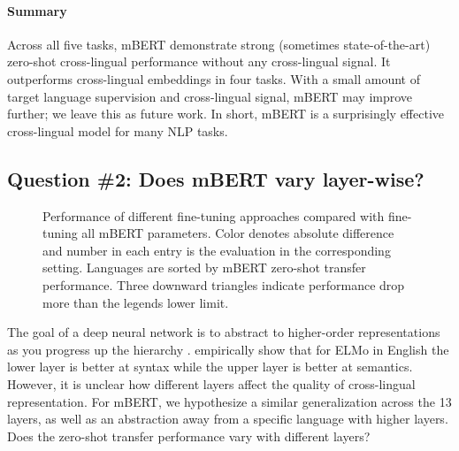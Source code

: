 \documentclass[11pt,a4paper]{article}
\begin{document}
\paragraph{Summary} Across all five tasks, mBERT demonstrate strong (sometimes state-of-the-art) zero-shot cross-lingual performance without any cross-lingual signal. It outperforms cross-lingual embeddings in four tasks. With a small amount of target language supervision and cross-lingual signal, mBERT may improve further; we leave this as future work. In short, mBERT is a surprisingly effective cross-lingual model for many NLP tasks.


\subsection{Question \#2: Does mBERT vary layer-wise?}\label{sec:exp2}


\begin{figure*}[ht]
\centering
{}
\qquad

\qquad


\caption{Performance of different fine-tuning approaches compared with fine-tuning all mBERT parameters. Color denotes absolute difference and number in each entry is the evaluation in the corresponding setting. Languages are sorted by mBERT zero-shot transfer performance. Three downward triangles indicate performance drop more than the legends lower limit.
}\label{fig:heatmap}
\end{figure*}

The goal of a deep neural network is to abstract to higher-order representations as you progress up the hierarchy \cite{yosinski2014transferable}.  empirically show that for ELMo in English the lower layer is better at syntax while the upper layer is better at semantics. However, it is unclear how different layers affect the quality of cross-lingual representation. For mBERT, we hypothesize a similar generalization across the 13 layers, as well as an abstraction away from a specific language with higher layers. Does the zero-shot transfer performance vary with different layers?
\end{document}
